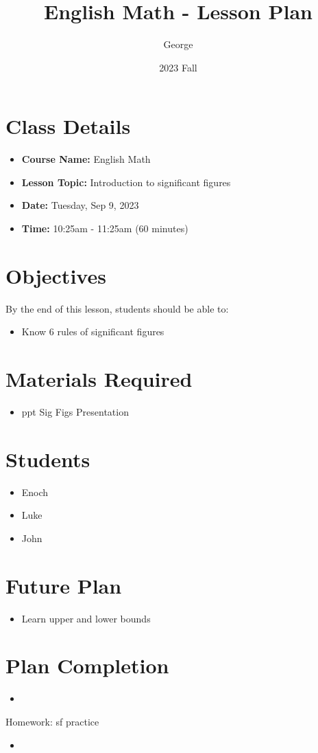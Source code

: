 \documentclass[12pt]{article}
\title{English Math - Lesson Plan}
\author{George}
\date{2023 Fall}
\begin{document}
\maketitle

\section{Class Details}
\begin{itemize}
    \item \textbf{Course Name:} English Math
    \item \textbf{Lesson Topic:}  Introduction to significant figures
    \item \textbf{Date:} Tuesday, Sep 9, 2023
    \item \textbf{Time:} 10:25am - 11:25am (60 minutes)
\end{itemize}

\section{Objectives}
By the end of this lesson, students should be able to:
\begin{itemize}
    \item Know 6 rules of significant figures
   

\end{itemize}

\section{Materials Required}
\begin{itemize}
   
    \item ppt Sig Figs Presentation

  
\end{itemize}


\section{Students}
\begin{itemize}
    \item Enoch
    \item Luke
    \item John

\end{itemize}


\section{Future Plan}
\begin{itemize}
    \item Learn upper and lower bounds

\end{itemize}
\section{Plan Completion}
\begin{itemize}
    \item 
\end{itemize}
Homework: sf practice
\begin{itemize}
    \item 
\end{itemize}
\end{document}
